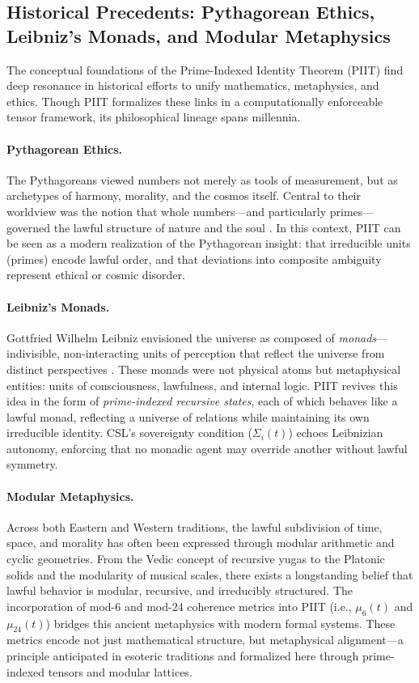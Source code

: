 \documentclass[12pt]{article}
\begin{document}
\subsection{Historical Precedents: Pythagorean Ethics, Leibniz’s Monads, and Modular Metaphysics}

The conceptual foundations of the Prime-Indexed Identity Theorem (PIIT) find deep resonance in historical efforts to unify mathematics, metaphysics, and ethics. Though PIIT formalizes these links in a computationally enforceable tensor framework, its philosophical lineage spans millennia.

\paragraph{Pythagorean Ethics.}
The Pythagoreans viewed numbers not merely as tools of measurement, but as archetypes of harmony, morality, and the cosmos itself. Central to their worldview was the notion that whole numbers—and particularly primes—governed the lawful structure of nature and the soul \cite{kirk1983presocratic}. In this context, PIIT can be seen as a modern realization of the Pythagorean insight: that irreducible units (primes) encode lawful order, and that deviations into composite ambiguity represent ethical or cosmic disorder.

\paragraph{Leibniz’s Monads.}
Gottfried Wilhelm Leibniz envisioned the universe as composed of \textit{monads}—indivisible, non-interacting units of perception that reflect the universe from distinct perspectives \cite{leibniz1989philosophical}. These monads were not physical atoms but metaphysical entities: units of consciousness, lawfulness, and internal logic. PIIT revives this idea in the form of \textit{prime-indexed recursive states}, each of which behaves like a lawful monad, reflecting a universe of relations while maintaining its own irreducible identity. CSL’s sovereignty condition ($\Sigma_i(t)$) echoes Leibnizian autonomy, enforcing that no monadic agent may override another without lawful symmetry.

\paragraph{Modular Metaphysics.}
Across both Eastern and Western traditions, the lawful subdivision of time, space, and morality has often been expressed through modular arithmetic and cyclic geometries. From the Vedic concept of recursive yugas to the Platonic solids and the modularity of musical scales, there exists a longstanding belief that lawful behavior is modular, recursive, and irreducibly structured. The incorporation of mod-6 and mod-24 coherence metrics into PIIT (i.e., $\mu_6(t)$ and $\mu_{24}(t)$) bridges this ancient metaphysics with modern formal systems. These metrics encode not just mathematical structure, but metaphysical alignment—a principle anticipated in esoteric traditions and formalized here through prime-indexed tensors and modular lattices.
\end{document}
